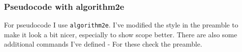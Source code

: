 \documentclass[
../../Summary.tex,
]
{subfiles}
\begin{document}
\subsubsection{Pseudocode with algorithm2e}
For pseudocode I use \texttt{algorithm2e}. I've modified the style in the preamble to make it look a bit nicer, especially to show scope better. There are also some additional commands I've defined - For these check the preamble.

\begin{codebox}
    \begin{algorithm}[H]

    \end{algorithm}
\end{codebox}
\end{document}
